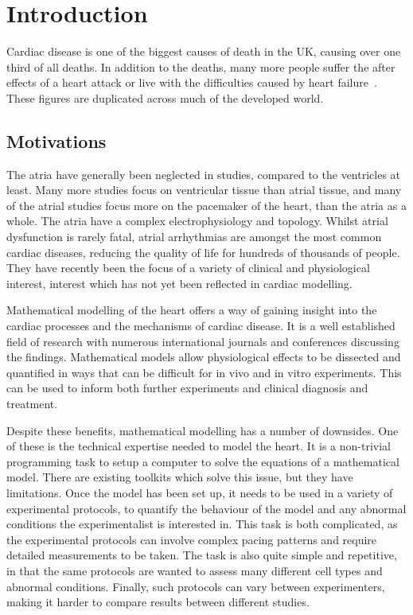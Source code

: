 \chapter{Introduction}

Cardiac disease is one of the biggest causes of death in the UK, causing over
one third of all deaths.
In addition to the deaths, many more people suffer the after effects of a heart
attack or live with the difficulties caused by heart failure~\cite{bhf2008}.
These figures are duplicated across much of the developed world.


\section{Motivations}

The atria have generally been neglected in studies, compared to the ventricles
at least.
Many more studies focus on ventricular tissue than atrial tissue, and many of
the atrial studies focus more on the pacemaker of the heart, than the atria as a
whole.
The atria have a complex electrophysiology and topology.
Whilst atrial dysfunction is rarely fatal, atrial arrhythmias are amongst the
most common cardiac diseases, reducing the quality of life for hundreds of
thousands of people.
They have recently been the focus of a variety of clinical and physiological
interest, interest which has not yet been reflected in cardiac modelling.

Mathematical modelling of the heart offers a way of gaining insight into the
cardiac processes and the mechanisms of cardiac disease.
It is a well established field of research with numerous international journals
and conferences discussing the findings.
Mathematical models allow physiological effects to be dissected and quantified
in ways that can be difficult for in vivo and in vitro experiments.
This can be used to inform both further experiments and clinical diagnosis and
treatment.

Despite these benefits, mathematical modelling has a number of downsides.
One of these is the technical expertise needed to model the heart.
It is a non-trivial programming task to setup a computer to solve the equations
of a mathematical model.
There are existing toolkits which solve this issue, but they have limitations.
Once the model has been set up, it needs to be used in a variety of experimental
protocols, to quantify the behaviour of the model and any abnormal conditions
the experimentalist is interested in.
This task is both complicated, as the experimental protocols can involve complex
pacing patterns and require detailed measurements to be taken.
The task is also quite simple and repetitive, in that the same protocols are
wanted to assess many different cell types and abnormal conditions.
Finally, such protocols can vary between experimenters, making it harder to
compare results between different studies.

